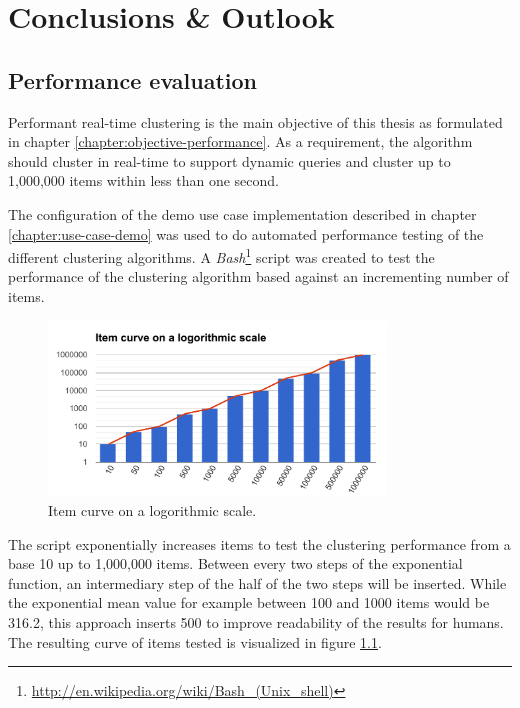 
%
%

\chapter{Conclusions \& Outlook}
\label{chapter:conclusions-outlook}

\section{Performance evaluation}
\label{chapter:performance}

Performant real-time clustering is the main objective of this thesis as formulated in chapter \ref{chapter:objective-performance}. As a requirement, the algorithm should cluster in real-time to support dynamic queries and cluster up to 1,000,000 items within less than one second.

The configuration of the demo use case implementation described in chapter \ref{chapter:use-case-demo} was used to do automated performance testing of the different clustering algorithms. A \textit{Bash}\footnote{\url{http://en.wikipedia.org/wiki/Bash\_(Unix\_shell)}} script was created to test the performance of the clustering algorithm based against an incrementing number of items.

\begin{figure}[h]
  \begin{center}
    \includegraphics[width=0.8\textwidth]{figures/performance_items.pdf}
    \caption{Item curve on a logorithmic scale.}
    \label{fig:performance-items}
  \end{center}
\end{figure}

The script exponentially increases items to test the clustering performance from a base 10 up to 1,000,000 items. Between every two steps of the exponential function, an intermediary step of the half of the two steps will be inserted. While the exponential mean value for example between 100 and 1000 items would be 316.2, this approach inserts 500 to improve readability of the results for humans. The resulting curve of items tested is visualized in figure \ref{fig:performance-items}.

